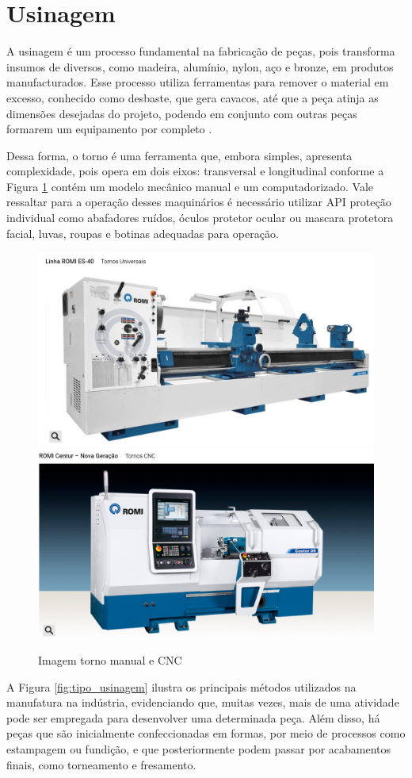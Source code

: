 \section{Usinagem}
\label{sec:usinagem}

A usinagem é um processo fundamental na fabricação de peças, pois transforma insumos de diversos, como madeira, alumínio, nylon, aço e bronze, em produtos manufacturados. Esse processo utiliza ferramentas para remover o material em excesso, conhecido como desbaste, que gera cavacos, até que a peça atinja as dimensões desejadas do projeto, podendo em conjunto com outras peças formarem um equipamento por completo \mbox{\cite{a:guia_usinagem_2024}.}

Dessa forma, o torno é uma ferramenta que, embora simples, apresenta complexidade, pois opera em dois eixos: transversal e longitudinal conforme a Figura \ref{fig:tornos} contém um modelo mecânico manual e um computadorizado. Vale ressaltar para a operação desses maquinários é necessário utilizar API proteção individual como abafadores ruídos, óculos protetor ocular ou mascara protetora facial, luvas, roupas e botinas adequadas para operação.

\begin{figure}[tbh!]
    \centering
    \includegraphics[width=0.48 \linewidth]{figs/rome_es40.png}
    \includegraphics[width=0.48 \linewidth]{figs/romi_cnc.png}
    \caption{Imagem torno manual e CNC \cite{m:figs_tornos}}
    \label{fig:tornos}
\end{figure}

A Figura \ref{fig:tipo_usinagem} ilustra os principais métodos utilizados na manufatura na indústria, evidenciando que, muitas vezes, mais de uma atividade pode ser empregada para desenvolver uma determinada peça. Além disso, há peças que são inicialmente confeccionadas em formas, por meio de processos como estampagem ou fundição, e que posteriormente podem passar por acabamentos finais, como torneamento e fresamento.

